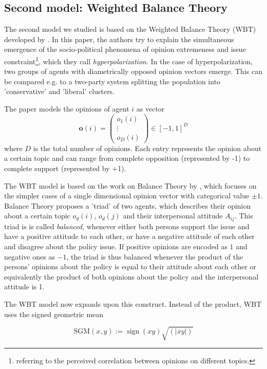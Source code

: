 \documentclass[11pt]{article}
\DeclareMathOperator{\sign}{sign}
\begin{document}
\FloatBarrier
\subsection{Second model: Weighted Balance Theory}
\label{wbt_descr}

The second model we studied is based on the Weighted Balance Theory (WBT) developed by \citet{schweighofer2020}. In this paper, the authors try to explain the simultaneous emergence of the socio-political phenomena of opinion extremeness and issue constraint\footnote{referring to the perceived correlation between opinions on different topics.}, which they call \textit{hyperpolarization}. In the case of hyperpolarization, two groups of agents with diametrically opposed opinion vectors emerge. This can be compared e.g. to a two-party system splitting the population into 'conservative' and 'liberal' clusters. 

The paper models the opinions of agent $i$ as vector 
\[
\mathbf{o}(i) = \begin{pmatrix} 
o_1(i) \\
\vdots \\
o_D(i)
\end{pmatrix}
\in [-1,1]^{D}
\]
where $D$ is the total number of opinions. Each entry represents the opinion about a certain topic and can range from complete opposition (represented by -1) to complete support (represented by +1).

The WBT model is based on the work on Balance Theory by \citet{heider1946}, which focuses on the simpler cases of a single dimensional opinion vector with categorical value $\pm 1$. Balance Theory proposes a 'triad' of two agents, which describes their opinion about a certain topic $o_d(i)$, $o_d(j)$ and their interpersonal attitude $A_{ij}$. This triad is is called \textit{balanced}, whenever either both persons support the issue and have a positive attitude to each other, or have a negative attitude of each other and disagree about the policy issue. If positive opinions are encoded as $1$ and negative ones as $-1$, the triad is thus balanced whenever the product of the persons' opinions about the policy is equal to their attitude about each other or equivalently the product of both opinions about the policy and the interpersonal attitude is 1.

The WBT model now expands upon this construct. Instead of the product, WBT uses the signed geometric mean

\[\text{SGM}(x,y):=\sign(xy)\sqrt{(|xy|)}\] 
\end{document}
